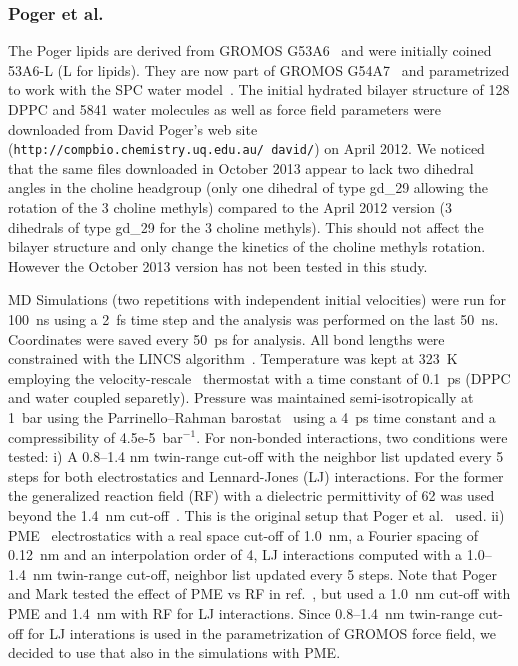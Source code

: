 \documentclass[pre,aps,floatfix,authordate1-4,twocolumn]{revtex4-1}
\begin{document}
\subsubsection{Poger et al.}
The Poger lipids are derived from GROMOS G53A6~\cite{poger10} and were initially coined 53A6-L (L for lipids). They are now part of GROMOS G54A7~\cite{poger12} and parametrized to work with the SPC water model~\cite{berendsen81}. The initial hydrated bilayer structure of 128 DPPC and 5841 water molecules as well as force field parameters were downloaded 
from David Poger's web site (\texttt{http://compbio.chemistry.uq.edu.au/~david/}) on April 2012. 
We noticed that the same files downloaded in October 2013 appear to lack two dihedral angles in the choline headgroup (only one dihedral of type gd\_29 allowing 
the rotation of the 3 choline methyls) compared to the April 2012 version (3 dihedrals of type gd\_29 for the 3 choline methyls). This should not affect the 
bilayer structure and only change the kinetics of the choline methyls rotation. However the October 2013 version has not been tested in this study.

MD Simulations (two repetitions with independent initial velocities) were run for 100~ns using a 2~fs time step and the analysis 
was performed on the last 50~ns. Coordinates were saved every 50~ps for analysis. All bond lengths were constrained with the LINCS algorithm~\cite{hess97,hess07}. Temperature was kept 
at 323~K employing the velocity-rescale~\cite{bussi07} thermostat with a time constant of 0.1~ps (DPPC and water coupled separetly). Pressure was maintained semi-isotropically at 1~bar using 
the Parrinello--Rahman barostat~\cite{parrinello81} using a 4~ps time constant and a compressibility of 4.5e-5~bar$^{-1}$. For non-bonded interactions, two conditions were tested:
i) A 0.8--1.4 nm twin-range cut-off with the neighbor list updated every 5 steps for both electrostatics and Lennard-Jones (LJ) interactions. For the former the generalized reaction 
field (RF) with a dielectric permittivity of 62 was used beyond the 1.4~nm cut-off~\cite{tironi95}. This is the original setup that Poger et al.~\cite{poger10} used.
ii) PME~\cite{darden93,essman95} electrostatics with a real space cut-off of 1.0~nm, a Fourier spacing of 0.12~nm and an interpolation order of 4, LJ interactions computed with a 1.0--1.4~nm twin-range cut-off,
neighbor list updated every 5 steps. Note that Poger and Mark tested the effect of PME vs RF in ref.~\cite{poger12}, but used a 1.0~nm cut-off with PME and 1.4~nm with RF for LJ
interactions. Since 0.8--1.4~nm twin-range cut-off for LJ interations is used in the parametrization of GROMOS force field, we decided to use that
also in the simulations with PME.
\end{document}
